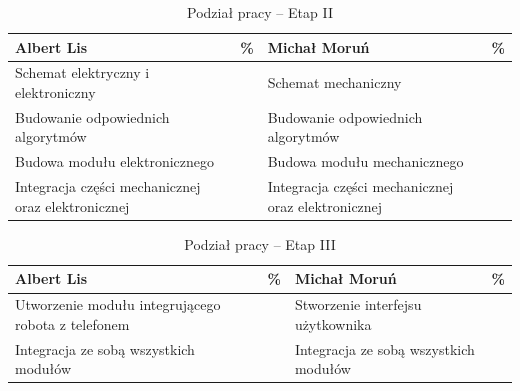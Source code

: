 \documentclass[10pt, a4paper]{article}
\begin{document}
\begin{table}[H]
	\centering
	\begin{tabular}{|L{7cm}|L{0.8cm}||L{7cm}|L{0.8cm}|}
		\hline
		\hline
		\textbf{Albert Lis} & 
		\% & 
		\textbf{Michał Moruń} & \%\\
		\hline
		\hline
		Schemat elektryczny i elektroniczny		& &	
		Schemat mechaniczny &\\
		\hline
		Budowanie odpowiednich algorytmów & &
		Budowanie odpowiednich algorytmów &\\
		\hline
		Budowa modułu elektronicznego & &
		Budowa modułu mechanicznego & \\
		\hline
		Integracja części mechanicznej oraz elektronicznej & & 
		Integracja części mechanicznej oraz elektronicznej &\\
		\hline
	\end{tabular}
	\caption{Podział pracy -- Etap II}
	\label{tab:PodzialPracyEtap2}
\end{table}

\begin{table}[H]
	\centering
	\begin{tabular}{|L{7cm}|L{0.8cm}||L{7cm}|L{0.8cm}|}
		\hline
		\hline
		\textbf{Albert Lis} & 
		\% & 
		\textbf{Michał Moruń} & \%\\
		\hline
		\hline
		Utworzenie modułu integrującego robota z telefonem & &	
		Stworzenie interfejsu użytkownika &\\
		\hline
		 Integracja ze sobą wszystkich modułów & &
		 Integracja ze sobą wszystkich modułów & \\
		\hline
	\end{tabular}
	\caption{Podział pracy -- Etap III}
	\label{tab:PodzialPracyEtap3}
\end{table}
\end{document}
